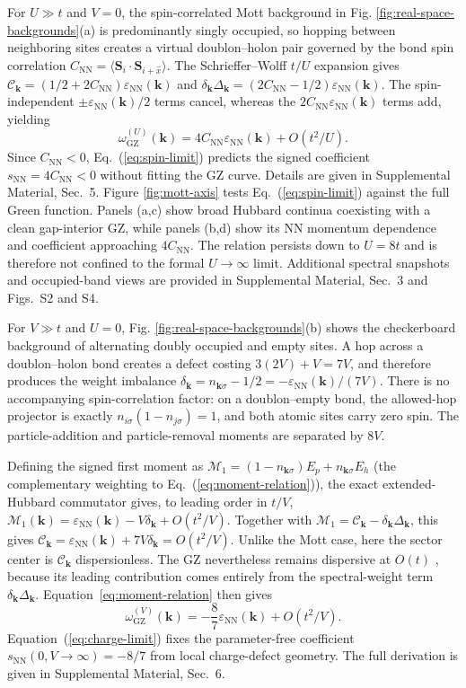 \documentclass[aps,prl,reprint,superscriptaddress,nofootinbib,longbibliography]{revtex4-1}
\newcommand{\epsk}{\varepsilon_{\mathrm{NN}}(\mathbf{k})}
\newcommand{\wzero}{\omega_{\mathrm{GZ}}}
\newcommand{\disp}[1]{Eq.~(\ref{#1})}
\newcommand{\Disp}[1]{Equation~(\ref{#1})}
\newcommand{\figdisp}[1]{Fig. \ref{#1}}
\newcommand{\Figdisp}[1]{Figure \ref{#1}}
\begin{document}
For $U\gg t$ and $V=0$, the spin-correlated Mott background in \figdisp{fig:real-space-backgrounds}(a) is predominantly singly occupied, so hopping between neighboring sites creates a virtual doublon--holon pair governed by the bond spin
correlation
$C_{\mathrm{NN}}=\langle\mathbf S_i\!\cdot\!\mathbf S_{i+\hat x}\rangle$. The Schrieffer--Wolff $t/U$ expansion \cite{macdonald1988tu} gives
$\mathcal C_{\mathbf k}
 = (1/2+2C_{\mathrm{NN}})\epsk$ and $
\delta_{\mathbf k}\Delta_{\mathbf k}
 = (2C_{\mathrm{NN}}-1/2)\epsk$.
The spin-independent $\pm\epsk/2$ terms cancel, whereas the
$2C_{\mathrm{NN}}\epsk$ terms add, yielding
\begin{equation}
\wzero^{(U)}(\mathbf{k})
 =4C_{\mathrm{NN}}\epsk+O(t^2/U).
\label{eq:spin-limit}
\end{equation}
Since $C_{\mathrm{NN}}<0$, \disp{eq:spin-limit} predicts the signed
coefficient $s_{\mathrm{NN}}=4C_{\mathrm{NN}}<0$ without fitting the
GZ curve. Details are given in Supplemental Material, Sec.~5. \Figdisp{fig:mott-axis} tests \disp{eq:spin-limit} against the full
Green function. Panels (a,c) show broad Hubbard continua coexisting
with a clean gap-interior GZ, while panels (b,d) show its NN momentum
dependence and coefficient approaching $4C_{\mathrm{NN}}$. The
relation persists down to $U=8t$ and is therefore not confined to the
formal $U\to\infty$ limit. Additional spectral snapshots and
occupied-band views are provided in Supplemental Material, Sec.~3
and Figs.~S2 and S4.

For $V\gg t$ and $U=0$, \figdisp{fig:real-space-backgrounds}(b) shows the checkerboard background of alternating doubly occupied and empty sites. A hop across a doublon--holon bond creates a defect costing
$3(2V)+V=7V$, and therefore produces the weight imbalance $\delta_{\mathbf k}=n_{\mathbf k\sigma}-1/2=-\epsk/(7V)$. There is no accompanying spin-correlation factor: on a doublon--empty bond, the allowed-hop projector is exactly $n_{i\sigma}(1-n_{j\sigma})=1$, and both atomic sites carry zero spin. The particle-addition and particle-removal moments are separated by $8V$.

Defining the signed first moment as $\mathcal M_1=(1-n_{\mathbf k\sigma})E_p+n_{\mathbf k\sigma}E_h$ (the complementary weighting to \disp{eq:moment-relation}), the exact extended-Hubbard commutator gives, to leading order in $t/V$,
$\mathcal M_1(\mathbf k)=\epsk-V\delta_{\mathbf k}+O(t^2/V)$. Together with
$\mathcal M_1=\mathcal C_{\mathbf k}-\delta_{\mathbf k}\Delta_{\mathbf k}$,
this gives
$\mathcal C_{\mathbf k}
=\epsk+7V\delta_{\mathbf k}
=O(t^2/V).$ Unlike the Mott case, here the sector center is $\mathcal C_{\mathbf k}$ dispersionless. The GZ nevertheless remains dispersive at $O(t)$ , because its leading contribution comes entirely from the spectral-weight term $\delta_{\mathbf k}\Delta_{\mathbf k}$. 
Equation~\ref{eq:moment-relation} then gives
\begin{equation}
\wzero^{(V)}(\mathbf{k})=-\frac{8}{7}\epsk+O(t^2/V).
\label{eq:charge-limit}
\end{equation}
\Disp{eq:charge-limit} fixes the parameter-free coefficient
$s_{\mathrm{NN}}(0,V\!\to\!\infty)=-8/7$ from local charge-defect
geometry. The full derivation is given in Supplemental Material,
Sec.~6.
\end{document}
